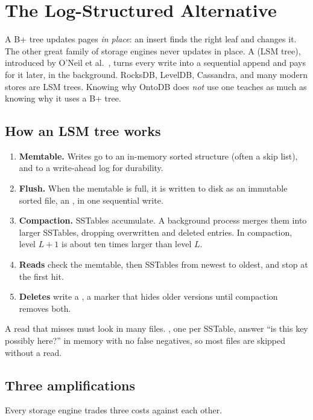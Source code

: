\chapter{The Log-Structured Alternative}
\label{ch:lsm}

A B+ tree updates pages \emph{in place}: an insert finds the right leaf and
changes it. The other great family of storage engines never updates in place.
A  (LSM tree), introduced by O'Neil et al.\
\cite{lsm}, turns every write into a sequential append and pays for it later,
in the background. RocksDB, LevelDB, Cassandra, and many modern stores are LSM
trees. Knowing why OntoDB does \emph{not} use one teaches as much as knowing why
it uses a B+ tree.

\section{How an LSM tree works}

\begin{enumerate}
\item \textbf{Memtable.} Writes go to an in-memory sorted structure (often a skip list), and to a write-ahead log for durability.
\item \textbf{Flush.} When the memtable is full, it is written to disk as an immutable sorted file, an \term{SSTable}, in one sequential write.
\item \textbf{Compaction.} SSTables accumulate. A background process merges them into larger SSTables, dropping overwritten and deleted entries. In  compaction, level $L+1$ is about ten times larger than level $L$.
\item \textbf{Reads} check the memtable, then SSTables from newest to oldest, and stop at the first hit.
\item \textbf{Deletes} write a \term{tombstone}, a marker that hides older versions until compaction removes both.
\end{enumerate}

A read that misses must look in many files. , one per
SSTable, answer ``is this key possibly here?'' in memory with no false
negatives, so most files are skipped without a read.

\section{Three amplifications}

Every storage engine trades three costs against each other.

